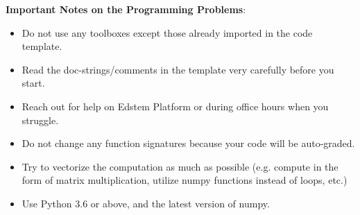 \textbf{Important Notes on the Programming Problems}:
\begin{itemize}
    \item Do not use any toolboxes except those already imported in the code template. 
    \item Read the doc-strings/comments in the template very carefully before you start. 
    \item Reach out for help on Edstem Platform or during office hours when you struggle. 
    \item Do not change any function signatures because your code will be auto-graded. 
    \item Try to vectorize the computation as much as possible (e.g. compute in the form of matrix multiplication, utilize numpy functions instead of loops, etc.)
    \item Use Python 3.6 or above, and the latest version of numpy.
\end{itemize}




